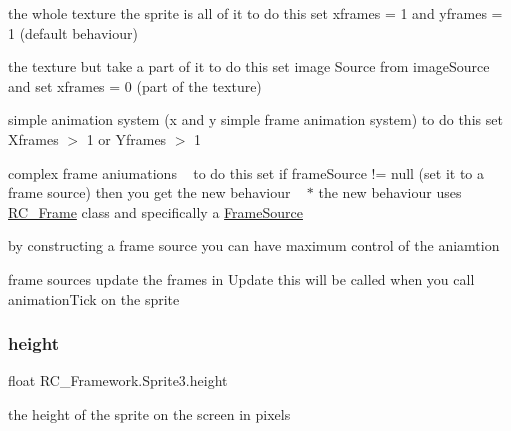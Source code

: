 \begin{DoxyItemize}
\item the whole texture the sprite is all of it to do this set xframes = 1 and yframes = 1 (default behaviour)
\item the texture but take a part of it to do this set image Source from image\+Source and set xframes = 0 (part of the texture)
\item simple animation system (x and y simple frame animation system) to do this set Xframes $>$ 1 or Yframes $>$ 1
\item complex frame aniumations ~\newline
 to do this set if frame\+Source != null (set it to a frame source) then you get the new behaviour ~\newline
 $\ast$ the new behaviour uses \mbox{\hyperlink{class_r_c___framework_1_1_r_c___frame}{R\+C\+\_\+\+Frame}} class and specifically a \mbox{\hyperlink{class_r_c___framework_1_1_frame_source}{Frame\+Source}}
\begin{DoxyItemize}
\item by constructing a frame source you can have maximum control of the aniamtion
\item frame sources update the frames in Update this will be called when you call animation\+Tick on the sprite 
\end{DoxyItemize}
\end{DoxyItemize}\mbox{\label{class_r_c___framework_1_1_sprite3_a3868e4ebe3d2ac0311fcf950650c5f91}} 
\subsubsection{\texorpdfstring{height}{height}}
{\footnotesize\ttfamily float R\+C\+\_\+\+Framework.\+Sprite3.\+height\hspace{0.3cm}{\ttfamily [protected]}}



the height of the sprite on the screen in pixels 

\mbox{\label{class_r_c___framework_1_1_sprite3_abe8d4ab8316448c8d9ff2da22b680380}} 
